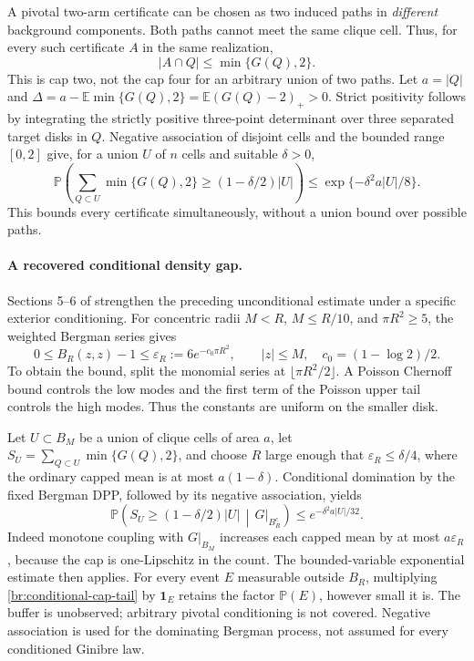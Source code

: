 \documentclass[11pt,a4paper]{article}
\theoremstyle{definition}
\theoremstyle{remark}
\numberwithin{equation}{section}
\begin{document}
A pivotal two-arm certificate can be chosen as two induced paths in
\emph{different} background components.  Both paths cannot meet the
same clique cell.  Thus, for every such certificate $A$ in the same
realization,
\begin{equation}
 |A\cap Q|\leq\min\{G(Q),2\}.
 \label{br:cap-two}
\end{equation}
This is cap two, not the cap four for an arbitrary union of two paths.
Let $a=|Q|$ and
$\Delta=a-\mathbb E\min\{G(Q),2\}
=\mathbb E(G(Q)-2)_+>0$.
Strict positivity follows by integrating the strictly positive
three-point determinant over three separated target disks in $Q$.
Negative association of disjoint cells and the bounded range $[0,2]$
give, for a union $U$ of $n$ cells and suitable $\delta>0$,
\[
 \mathbb P\left(\sum_{Q\subset U}\min\{G(Q),2\}
          \geq(1-\delta/2)|U|\right)
 \leq\exp\{-\delta^2a|U|/8\}.
\]
This bounds every certificate simultaneously, without a union bound
over possible paths.

\paragraph{A recovered conditional density gap.}
\label{br:conditional-density}
Sections 5--6 of 
strengthen the preceding unconditional estimate under a specific
exterior conditioning. For concentric radii $M<R$, $M\le R/10$,
and $\pi R^2\ge5$, the weighted Bergman series gives
\[
 0\le B_R(z,z)-1\le\varepsilon_R
       :=6e^{-c_0\pi R^2},\qquad |z|\le M,\quad
 c_0=(1-\log2)/2.
\]
To obtain the bound, split the monomial series at
$\lfloor\pi R^2/2\rfloor$. A Poisson Chernoff bound controls the
low modes and the first term of the Poisson upper tail controls
the high modes. Thus the constants are uniform on the smaller disk.

Let $U\subset B_M$ be a union of clique cells of area $a$, let
$S_U=\sum_{Q\subset U}\min\{G(Q),2\}$, and choose $R$ large enough
that $\varepsilon_R\le\delta/4$, where the ordinary capped mean is
at most $a(1-\delta)$. Conditional domination by the fixed Bergman
DPP, followed by its negative association, yields
\begin{equation}\label{br:conditional-cap-tail}
 \mathbb P\left(S_U\ge(1-\delta/2)|U|
                      \,\middle|\,G|_{B_R^c}\right)
       \le e^{-\delta^2a|U|/32}.
\end{equation}
Indeed monotone coupling with $G|_{B_M}$ increases each capped mean
by at most $a\varepsilon_R$, because the cap is one-Lipschitz in
the count. The bounded-variable exponential estimate then applies.
For every event $E$ measurable outside $B_R$, multiplying
\eqref{br:conditional-cap-tail} by $\mathbf1_E$ retains the factor
$\mathbb P(E)$, however small it is. The buffer is unobserved;
arbitrary pivotal conditioning is not covered. Negative association
is used for the dominating Bergman process, not assumed for every
conditioned Ginibre law.
\end{document}
